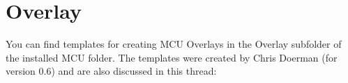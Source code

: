 \section{Overlay}\label{overlay}

You can find templates for creating MCU Overlays in the Overlay
subfolder of the installed MCU folder. The templates were
created by Chris Doerman (for version 0.6) and are also discussed in this thread:
